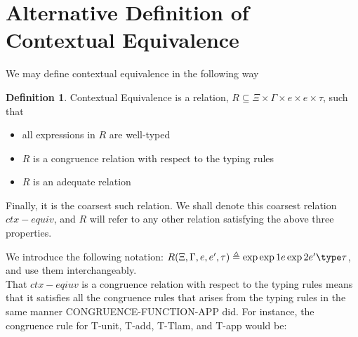\documentclass[twoside,11pt,openright]{report}
\theoremstyle{definition}
\newtheorem{definition}{Definition}[section]
\newcommand{\expr}{e}
\newcommand{\TT}{()}
\newcommand{\Tvar}{X}
\newcommand{\Tlam}{\Lambda\;}
\newcommand{\Tapp}[1]{#1\;\_}
\newcommand{\subst}[3]{#1{\left[#3 \middle/ #2 \right]}}
\newcommand{\Tunit}{\mathsf{Unit}}
\newcommand{\Tint}{\mathbb{Z}}
\newcommand{\Tall}[2]{\forall #1.\; #2}
\newcommand{\typ}{\tau}
\newcommand{\venv}{\Gamma}
\newcommand{\tenv}{\Xi}
\def\envscteqgen#1#2\exp1#3\exp2#4\type#5
\begin{document}
\section{Alternative Definition of Contextual Equivalence}
We may define contextual equivalence in the following way
\begin{definition}\label{def:CE2}
  Contextual Equivalence is a relation, $R \subseteq \tenv \times \venv \times \expr \times \expr \times \typ$, such that
  \begin{itemize}
    \item all expressions in $R$ are well-typed
    \item $R$ is a congruence relation with respect to the typing rules
    \item $R$ is an adequate relation
  \end{itemize}
  Finally, it is the coarsest such relation. We shall denote this coarsest relation $ctx-equiv$, and $R$ will refer to any other relation satisfying the above three properties. 
\end{definition}
We introduce the following notation: $R(\tenv, \venv, \expr, \expr', \typ) \triangleq \envscteqgen \tenv \venv \exp1 \expr \exp2 \expr' \type \typ$, and use them interchangeably.\\ 
That $ctx-eqiuv$ is a congruence relation with respect to the typing rules means that it satisfies all the congruence rules that arises from the typing rules in the same manner CONGRUENCE-FUNCTION-APP did. For instance, the congruence rule for T-unit, T-add, T-Tlam, and T-app would be:
\end{document}
